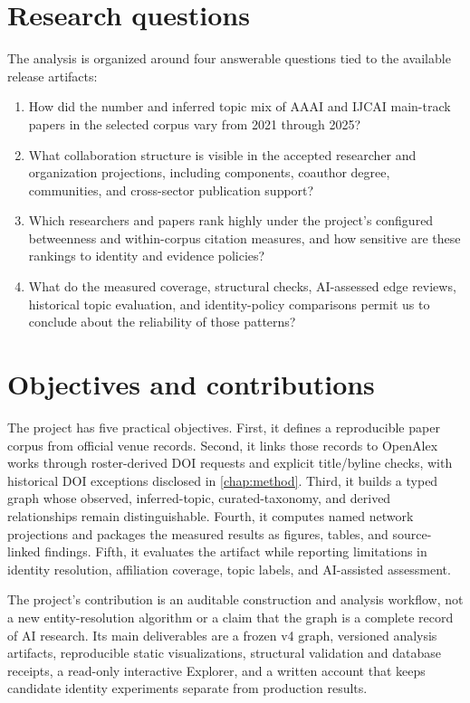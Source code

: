 \section{Research questions}

The analysis is organized around four answerable questions tied to the available
release artifacts:

\begin{enumerate}[label=\textbf{RQ\arabic*.},leftmargin=3em,labelwidth=2.4em,labelsep=0.6em,align=left]
  \item How did the number and inferred topic mix of AAAI and IJCAI main-track
  papers in the selected corpus vary from 2021 through 2025?
  \item What collaboration structure is visible in the accepted researcher and
  organization projections, including components, coauthor degree, communities,
  and cross-sector publication support?
  \item Which researchers and papers rank highly under the project's configured
  betweenness and within-corpus citation measures, and how sensitive are these
  rankings to identity and evidence policies?
  \item What do the measured coverage, structural checks, AI-assessed edge
  reviews, historical topic evaluation, and identity-policy comparisons permit
  us to conclude about the reliability of those patterns?
\end{enumerate}

\section{Objectives and contributions}

The project has five practical objectives. First, it defines a reproducible paper
corpus from official venue records. Second, it links those records to OpenAlex
works through roster-derived DOI requests and explicit title/byline checks,
with historical DOI exceptions disclosed in \cref{chap:method}. Third, it builds a typed graph whose observed,
inferred-topic, curated-taxonomy, and derived relationships remain distinguishable.
Fourth, it computes named network projections and packages the measured results
as figures, tables, and source-linked findings. Fifth, it evaluates the artifact
while reporting limitations in identity resolution, affiliation coverage, topic
labels, and AI-assisted assessment.

The project's contribution is an auditable construction and analysis workflow,
not a new entity-resolution algorithm or a claim that the graph is a complete
record of AI research. Its main deliverables are a frozen v4 graph, versioned
analysis artifacts, reproducible static visualizations, structural validation
and database receipts, a read-only interactive Explorer, and a written account
that keeps candidate identity experiments separate from production results.

